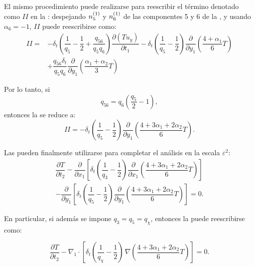 El mismo procedimiento puede realizarse para reescribir el término denotado como $II$ en la : despejando $n_{5}^{(1)}$ y $n_{6}^{(1)}$ de las componentes 5 y 6 de la , y usando $\alpha_6=-1$, $II$ puede reescribirse como:
\begin{equation}
\begin{aligned}
	II =& -\delta_t \left( \dfrac{1}{q_5} - \dfrac{1}{2}  + \dfrac{q_{56}}{q_5 q_6}  \right) \dfrac{\partial (Tu_y)}{\partial t_1} - \delta_t \left( \dfrac{1}{q_5} - \dfrac{1}{2} \right) \dfrac{\partial}{\partial y_1} \left(\dfrac{4+\alpha_1}{6} T \right) \\
	&+ \dfrac{q_{56}\delta_t}{q_5q_6}\dfrac{\partial}{\partial y_1} \left(\dfrac{\alpha_1+\alpha_2}{3} T \right)
	\label{eq:II_0}
\end{aligned}
\end{equation}


Por lo tanto, si 
\begin{equation}
	q_{56} = q_6 \left( \dfrac{q_5}{2} - 1 \right),
\end{equation}
entonces la  se reduce a:
\begin{equation}
	II = -\delta_t \left( \dfrac{1}{q_5} - \dfrac{1}{2} \right) \dfrac{\partial}{\partial y_1} \left(\dfrac{4+3\alpha_1 + 2\alpha_2}{6} T \right).
	\label{eq:II_1}
\end{equation}

Las  pueden finalmente utilizarse para completar el an\'alisis en la escala $\varepsilon^2$:
\begin{equation}
	\begin{split}
	\dfrac{\partial T}{\partial t_2} -
	\dfrac{\partial}{\partial x_1}\left[ \delta_t \left( \dfrac{1}{q_3} - \dfrac{1}{2} \right) \dfrac{\partial}{\partial x_1} \left(\dfrac{4+3\alpha_1 + 2\alpha_2}{6} T \right) \right]	\\
	-  \dfrac{\partial}{\partial y_1}\left[ \delta_t \left( \dfrac{1}{q_5} - \dfrac{1}{2} \right) \dfrac{\partial}{\partial y_1} \left(\dfrac{4+3\alpha_1 + 2\alpha_2}{6} T \right) \right] = 0.
	\end{split}
	\label{eq:eps_2_clean}
\end{equation}

En particular, si adem\'as se impone $q_3=q_5=q_{\chi}$, entonces la  puede reescribirse como:

\begin{equation}
	\dfrac{\partial T}{\partial t_2} - \nabla_1 \cdot \left[ \delta_t \left( \dfrac{1}{q_{\chi}} - \dfrac{1}{2} \right) \, \nabla\left( \dfrac{4+3\alpha_1 + 2\alpha_2}{6} T \right) \right]  = 0.
	\label{eq:T_eps_2}
\end{equation}

